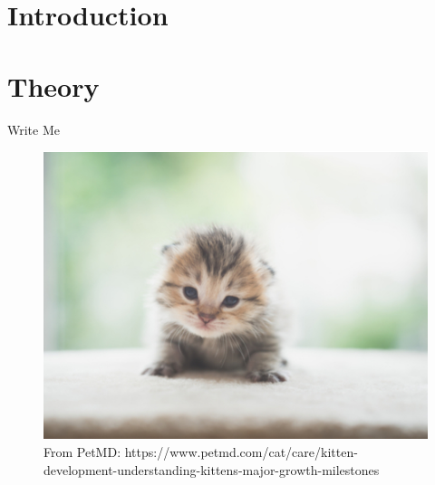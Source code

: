 \section{Introduction}

\section{Theory}

Write Me

\begin{figure}
  \includegraphics[width=1.0\columnwidth]{kitten.jpg}
  \caption[A cute kitten]{From PetMD: https://www.petmd.com/cat/care/kitten-development-understanding-kittens-major-growth-milestones}
\end{figure}
